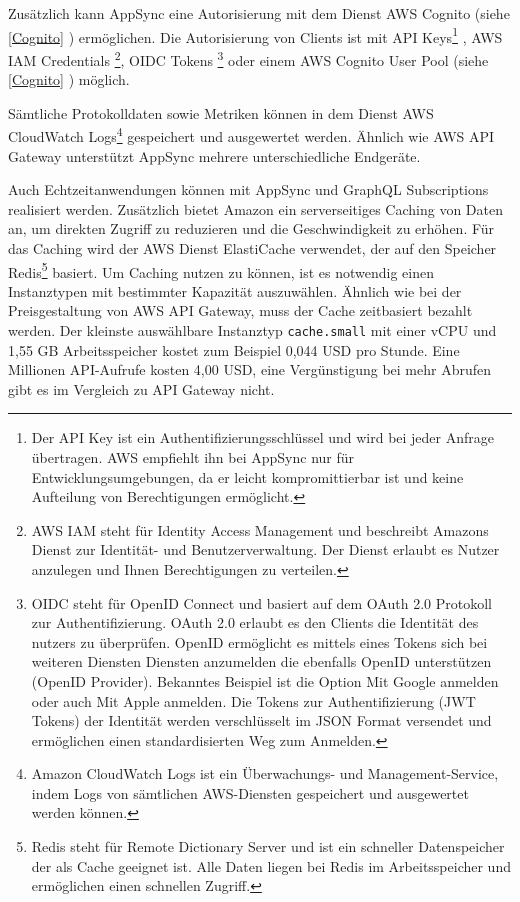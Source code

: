 Zusätzlich kann AppSync eine Autorisierung mit dem Dienst AWS Cognito (siehe \ref{Cognito} ) ermöglichen.
Die Autorisierung von Clients ist mit API Keys\footnote{Der API Key ist ein Authentifizierungsschlüssel und wird bei jeder Anfrage übertragen. AWS empfiehlt ihn bei AppSync nur für Entwicklungsumgebungen,
da er leicht kompromittierbar ist und keine Aufteilung von Berechtigungen ermöglicht.}
, AWS IAM Credentials \footnote{
    AWS IAM steht für Identity Access Management und beschreibt Amazons Dienst zur Identität- und Benutzerverwaltung. Der Dienst erlaubt es Nutzer anzulegen und
    Ihnen Berechtigungen zu verteilen.},
    OIDC Tokens \footnote{OIDC steht für OpenID Connect und basiert auf dem OAuth 2.0 Protokoll zur Authentifizierung.
    OAuth 2.0 erlaubt es den Clients die Identität des nutzers zu überprüfen.
    OpenID ermöglicht es mittels eines Tokens sich bei weiteren Diensten Diensten anzumelden die ebenfalls OpenID unterstützen (OpenID Provider).
    Bekanntes Beispiel ist die Option \glqq Mit Google anmelden\grqq{} oder auch \glqq Mit Apple anmelden\grqq.
    Die Tokens zur Authentifizierung (JWT Tokens) der Identität werden verschlüsselt im JSON Format versendet und ermöglichen einen standardisierten Weg zum Anmelden.

          } oder einem AWS
Cognito User Pool (siehe \ref{Cognito} ) möglich. \cite[]{AppSyncAuth}

Sämtliche Protokolldaten sowie Metriken können in dem Dienst AWS CloudWatch Logs\footnote{ Amazon CloudWatch Logs ist ein Überwachungs- und Management-Service, indem Logs von sämtlichen AWS-Diensten gespeichert und ausgewertet werden können. } gespeichert und ausgewertet werden.
Ähnlich wie AWS API Gateway unterstützt AppSync mehrere unterschiedliche Endgeräte.

Auch Echtzeitanwendungen können mit AppSync und GraphQL Subscriptions realisiert werden.
Zusätzlich bietet Amazon ein serverseitiges Caching von Daten an, um direkten Zugriff zu reduzieren und die Geschwindigkeit zu erhöhen.
Für das Caching wird der AWS Dienst ElastiCache verwendet, der auf den Speicher Redis\footnote{Redis steht für Remote Dictionary Server und ist ein schneller Datenspeicher der als Cache geeignet ist. Alle Daten liegen bei Redis im Arbeitsspeicher und ermöglichen einen schnellen Zugriff.} basiert.
Um Caching nutzen zu können, ist es notwendig einen Instanztypen mit bestimmter Kapazität auszuwählen.
Ähnlich wie bei der Preisgestaltung von AWS API Gateway, muss der Cache zeitbasiert bezahlt werden.
Der kleinste auswählbare Instanztyp \verb+cache.small+ mit einer vCPU und 1,55 GB Arbeitsspeicher kostet zum Beispiel 0,044 USD pro Stunde.
Eine Millionen API-Aufrufe kosten 4,00 USD, eine Vergünstigung bei mehr Abrufen gibt es im Vergleich zu API Gateway nicht.
\cite[]{AppSync} \cite[]{AppSyncPreise}



